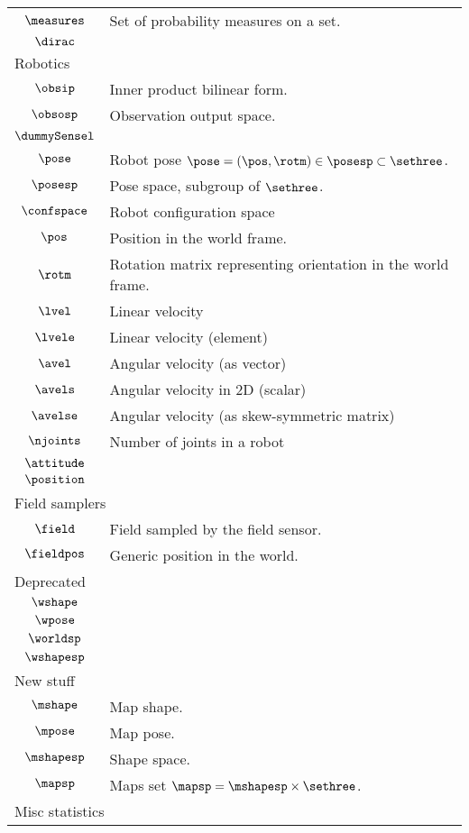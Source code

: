 \begin{longtable}{cl}
 $\measures$ &  Set of probability measures on a set.\\ 
 $\dirac$ & \\ 
 \multicolumn{2}{l}{Robotics}\\ 
 \hline
$\obsip$ &  Inner product bilinear form.\\ 
 $\obsosp$ &  Observation output space.\\ 
 $\dummySensel$ & \\ 
 $\pose$ &  Robot pose $\pose = (\pos, \rotm) \in \posesp \subset \sethree$.\\ 
 $\posesp$ &  Pose space, subgroup of $\sethree$.\\ 
 $\confspace$ &  Robot configuration space\\ 
 $\pos$ &  Position in the world frame.\\ 
 $\rotm$ &  Rotation matrix representing orientation in the world frame.\\ 
 $\lvel$ &  Linear velocity\\ 
 $\lvele$ &  Linear velocity (element)\\ 
 $\avel$ &  Angular velocity (as vector)\\ 
 $\avels$ &  Angular velocity in 2D (scalar)\\ 
 $\avelse$ &  Angular velocity (as skew-symmetric matrix)\\ 
 $\njoints$ &  Number of joints in a robot\\ 
 $\attitude$ & \\ 
 $\position$ & \\ 
 \multicolumn{2}{l}{Field samplers}\\ 
 \hline
$\field$ &  Field sampled by the field sensor.\\ 
 $\fieldpos$ &  Generic position in the world.\\ 
 \multicolumn{2}{l}{Deprecated}\\ 
 \hline
$\wshape$ & \\ 
 $\wpose$ & \\ 
 $\worldsp$ & \\ 
 $\wshapesp$ & \\ 
 \multicolumn{2}{l}{New stuff}\\ 
 \hline
$\mshape$ &  Map shape.\\ 
 $\mpose$ &  Map pose.\\ 
 $\mshapesp$ &  Shape space.\\ 
 $\mapsp$ &  Maps set $\mapsp = \mshapesp \times \sethree$.\\ 
 \multicolumn{2}{l}{Misc statistics}\\ 

\end{longtable}
